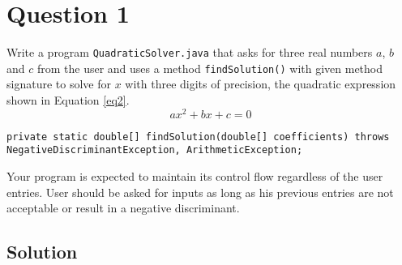 \documentclass[12pt,letterpaper,twoside]{article}
\begin{document}


\section*{Question 1}

Write a program \texttt{QuadraticSolver.java} that asks for three real numbers $a$, $b$ and $c$ from the user and uses a method \texttt{findSolution()} with given method signature to solve for $x$ with three digits of precision, the quadratic expression shown in Equation \ref{eq2}.
\begin{equation}
ax^2+bx+c=0
\label{eq2}
\end{equation}

\lstset{language=java,tabsize=2,numbers=none}
\begin{lstlisting}
private static double[] findSolution(double[] coefficients) throws NegativeDiscriminantException, ArithmeticException;
\end{lstlisting}

Your program is expected to maintain its control flow regardless of the user entries. User should be asked for inputs as long as his previous entries are not acceptable or result in a negative discriminant.

\subsection*{Solution}
\end{document}
